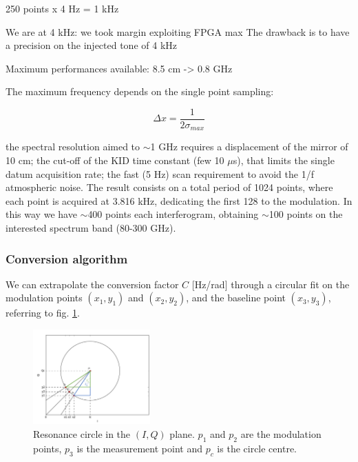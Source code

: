 \documentclass[twocolumn,traditabstract]{aa}\\
\begin{document}
250 points x 4 Hz = 1 kHz

We are at 4 kHz: we took margin exploiting FPGA max
The drawback is to have a precision on the injected tone of 4 kHz

Maximum performances available: 8.5 cm -> 0.8 GHz

The maximum frequency depends on the single point sampling:

\begin{equation}
	\Delta x = \frac{1}{2\sigma_{max} }
\end{equation}

\color{black}

the spectral resolution aimed to $\sim$1 GHz requires a displacement of the mirror of 10 cm; the cut-off of the KID time constant (few 10 $\mu$s), that limits the single datum acquisition rate; the fast (5 Hz) scan requirement to avoid the 1/f atmospheric noise. The result consists on a total period of 1024 points, where each point is acquired at 3.816 kHz, dedicating the first 128 to the modulation. In this way we have $\sim$400 points each interferogram, obtaining $\sim$100 points on the interested spectrum band (80-300 GHz).\\



\subsubsection{Conversion algorithm}
\label{conv}

\noindent We can extrapolate the conversion factor $C$ [Hz/rad] through a circular fit on the modulation points $(x_1,y_1)$ and $(x_2,y_2)$, and the baseline point $(x_3,y_3)$, referring to fig. \ref{fig:IQ_modulation}.

\begin{figure}[htf]
	\centering
	\includegraphics[width=0.4\textwidth]{3.acqui/circle.png}
	\caption{Resonance circle in the $(I,Q)$ plane. $p_1$ and $p_2$ are the modulation points, $p_3$ is the measurement point and $p_c$ is the circle centre. }
	\label{fig:IQ_modulation}
\end{figure}
\end{document}
